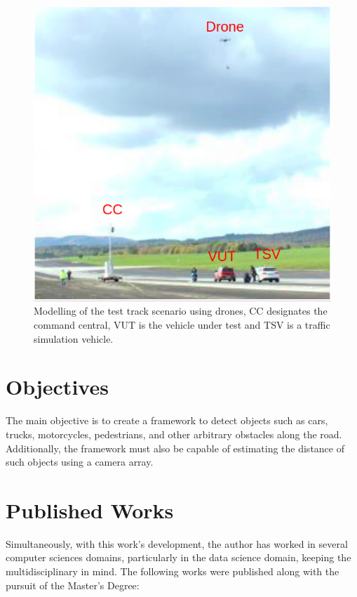 \begin{figure}[H]
\centering
\includegraphics[scale=0.55]{imagens/proposal.png}
\caption{Modelling of the test track scenario using drones, CC designates the command central, VUT is the vehicle under test and TSV is a traffic simulation vehicle.}
\label{fig:tests}
\end{figure}

\section{Objectives}

The main objective is to create a framework to detect objects such as cars, trucks, motorcycles, pedestrians, and other arbitrary obstacles along the road. Additionally, the framework must also be capable of estimating the distance of such objects using a camera array.

\section{Published Works}

Simultaneously, with this work's development, the author has worked in several computer sciences domains, particularly in the data science domain, keeping the multidisciplinary in mind. The following works were published along with the pursuit of the Master's Degree:

